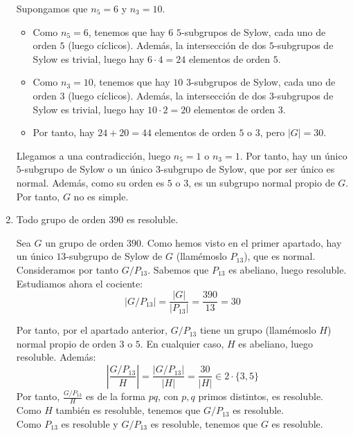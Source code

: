 \documentclass[12pt]{article}
\begin{document}
\begin{ejercicio}
\begin{enumerate}
            Supongamos que $n_{5}=6$ y $n_{3}=10$.
            \begin{itemize}
                \item Como $n_{5}=6$, tenemos que hay $6$ $5$-subgrupos de Sylow, cada uno de orden $5$ (luego cíclicos). Además, la intersección de dos $5$-subgrupos de Sylow es trivial, luego hay $6\cdot 4=24$ elementos de orden $5$.
                \item Como $n_{3}=10$, tenemos que hay $10$ $3$-subgrupos de Sylow, cada uno de orden $3$ (luego cíclicos). Además, la intersección de dos $3$-subgrupos de Sylow es trivial, luego hay $10\cdot 2=20$ elementos de orden $3$.
                \item Por tanto, hay $24+20=44$ elementos de orden $5$ o $3$, pero $|G|=30$.
            \end{itemize}

            Llegamos a una contradicción, luego $n_{5}=1$ o $n_{3}=1$. Por tanto, hay un único $5$-subgrupo de Sylow o un único $3$-subgrupo de Sylow, que por ser único es normal. Además, como su orden es $5$ o $3$, es un subgrupo normal propio de $G$. Por tanto, $G$ no es simple.
            \item Todo grupo de orden $390$ es resoluble.
            
            Sea $G$ un grupo de orden $390$. Como hemos visto en el primer apartado, hay un único $13$-subgrupo de Sylow de $G$ (llamémoslo $P_{13}$), que es normal.\\

            Consideramos por tanto $G/P_{13}$. Sabemos que $P_13$ es abeliano, luego resoluble. Estudiamos ahora el cociente:
            \begin{equation*}
                |G/P_{13}| = \frac{|G|}{|P_{13}|} = \frac{390}{13} = 30
            \end{equation*}

            Por tanto, por el apartado anterior, $G/P_{13}$ tiene un grupo (llamémoslo $H$) normal propio de orden $3$ o $5$. En cualquier caso, $H$ es abeliano, luego resoluble. Además:
            \begin{equation*}
                \left|\dfrac{G/P_{13}}{H}\right| = \frac{|G/P_{13}|}{|H|} =\frac{30}{|H|} \in 2\cdot \{3,5\}
            \end{equation*}
            Por tanto, $\frac{G/P_{13}}{H}$ es de la forma $pq$, con $p,q$ primos distintos, es resoluble. Como $H$ también es resoluble, tenemos que $G/P_{13}$ es resoluble.\\

            Como $P_{13}$ es resoluble y $G/P_{13}$ es resoluble, tenemos que $G$ es resoluble.
        \end{enumerate}
    \end{ejercicio}
\end{document}
